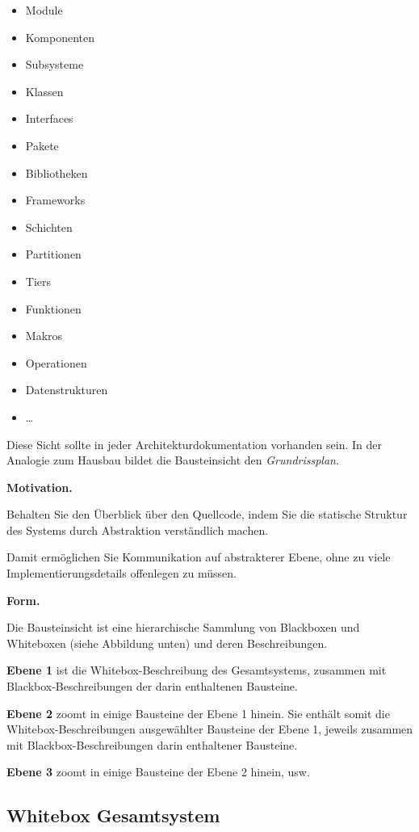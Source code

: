 \documentclass[]{article}
\begin{document}
\begin{itemize}
\item
  Module
\item
  Komponenten
\item
  Subsysteme
\item
  Klassen
\item
  Interfaces
\item
  Pakete
\item
  Bibliotheken
\item
  Frameworks
\item
  Schichten
\item
  Partitionen
\item
  Tiers
\item
  Funktionen
\item
  Makros
\item
  Operationen
\item
  Datenstrukturen
\item
  \ldots{}
\end{itemize}

Diese Sicht sollte in jeder Architekturdokumentation vorhanden sein. In
der Analogie zum Hausbau bildet die Bausteinsicht den
\emph{Grundrissplan}.

\textbf{Motivation.}

Behalten Sie den Überblick über den Quellcode, indem Sie die statische
Struktur des Systems durch Abstraktion verständlich machen.

Damit ermöglichen Sie Kommunikation auf abstrakterer Ebene, ohne zu
viele Implementierungsdetails offenlegen zu müssen.

\textbf{Form.}

Die Bausteinsicht ist eine hierarchische Sammlung von Blackboxen und
Whiteboxen (siehe Abbildung unten) und deren Beschreibungen.


\textbf{Ebene 1} ist die Whitebox-Beschreibung des Gesamtsystems,
zusammen mit Blackbox-Beschreibungen der darin enthaltenen Bausteine.

\textbf{Ebene 2} zoomt in einige Bausteine der Ebene 1 hinein. Sie
enthält somit die Whitebox-Beschreibungen ausgewählter Bausteine der
Ebene 1, jeweils zusammen mit Blackbox-Beschreibungen darin enthaltener
Bausteine.

\textbf{Ebene 3} zoomt in einige Bausteine der Ebene 2 hinein, usw.

\hypertarget{_whitebox_gesamtsystem}{%
\subsection{Whitebox Gesamtsystem}\label{_whitebox_gesamtsystem}}
\end{document}
